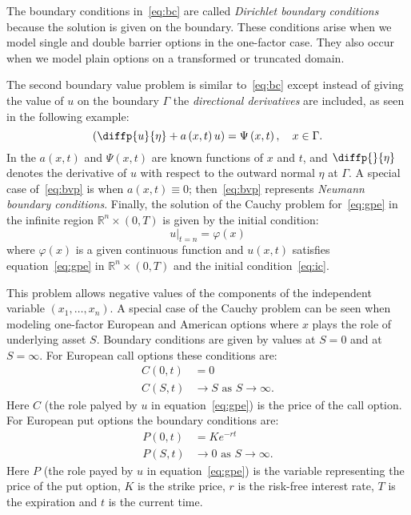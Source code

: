 \begin{frame}[t]{\subsecname}
The boundary conditions in~\eqref{eq:bc} are called \emph{Dirichlet boundary conditions} because the solution is given on the boundary. These conditions arise when we model single and double barrier options in the one-factor case. They also occur when we model plain options on a transformed or truncated domain.

The second boundary value problem is similar to~\eqref{eq:bc} except instead of giving the value of $u$ on the boundary $\Gamma$ the \emph{directional derivatives} are included, as seen in the following example:
\begin{equation}\label{eq:bvp}
\left(\diffp{u}{\eta}+a\left(x,t\right)u\right)=\Psi\left(x,t\right),\quad x\in\Gamma.
\end{equation}
In the  $a\left(x,t\right)$ and $\Psi\left(x,t\right)$ are known functions of $x$ and $t$, and $\diffp{}{\eta}$ denotes the derivative of $u$ with respect to the outward normal $\eta$ at $\Gamma$. A special case of~\eqref{eq:bvp} is when $a\left(x,t\right)\equiv0$; then~\eqref{eq:bvp} represents \emph{Neumann boundary conditions}. Finally, the solution of the Cauchy problem for~\eqref{eq:gpe} in the infinite region $\mathbb{R}^{n}\times\left(0,T\right)$ is given by the initial condition:
\begin{equation}\label{eq:ic}
{\left.u\right\vert}_{t=n}=\varphi\left(x\right)
\end{equation}
where $\varphi\left(x\right)$ is a given continuous function and $u\left(x,t\right)$ satisfies equation~\eqref{eq:gpe} in $\mathbb{R}^{n}\times\left(0,T\right)$ and the initial condition~\eqref{eq:ic}.
\end{frame}

\begin{frame}[t]{\subsecname}
This problem allows negative values of the components of the independent variable $\left(x_{1},\ldots,x_{n}\right)$. A special case of the Cauchy problem can be seen when modeling one-factor European and American options where $x$ plays the role of underlying asset $S$. Boundary conditions are given by values at $S=0$ and at $S=\infty$. For European call options these conditions are:
\begin{equation}
\begin{split}
C\left(0,t\right)&=0\\
C\left(S,t\right)&\to S\text{ as }S\to\infty.
\end{split}
\end{equation}
Here $C$ (the role palyed by $u$ in equation~\eqref{eq:gpe}) is the price of the call option. For European put options the boundary conditions are:
\begin{equation}
\begin{split}
P\left(0,t\right)&=Ke^{-rt}\\
P\left(S,t\right)&\to0\text{ as }S\to\infty.
\end{split}
\end{equation}
Here $P$ (the role payed by $u$ in equation~\eqref{eq:gpe}) is the variable representing the price of the put option, $K$ is the strike price, $r$ is the risk-free interest rate, $T$ is the expiration and $t$ is the current time.
\end{frame}

